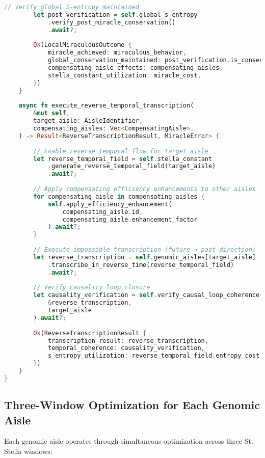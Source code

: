 \documentclass[12pt,a4paper]{article}
\begin{document}
\begin{lstlisting}[language=Rust, caption=St. Stella Constant Genomic Aisle Manager, basicstyle=\footnotesize]
        // Verify global S-entropy maintained
        let post_verification = self.global_s_entropy
            .verify_post_miracle_conservation()
            .await?;
        
        Ok(LocalMiraculousOutcome {
            miracle_achieved: miraculous_behavior,
            global_conservation_maintained: post_verification.is_conserved,
            compensating_aisle_effects: compensating_aisles,
            stella_constant_utilization: miracle_cost,
        })
    }
    
    async fn execute_reverse_temporal_transcription(
        &mut self,
        target_aisle: AisleIdentifier,
        compensating_aisles: Vec<CompensatingAisle>,
    ) -> Result<ReverseTranscriptionResult, MiracleError> {
        
        // Enable reverse temporal flow for target aisle
        let reverse_temporal_field = self.stella_constant
            .generate_reverse_temporal_field(target_aisle)
            .await?;
        
        // Apply compensating efficiency enhancements to other aisles
        for compensating_aisle in compensating_aisles {
            self.apply_efficiency_enhancement(
                compensating_aisle.id,
                compensating_aisle.enhancement_factor
            ).await?;
        }
        
        // Execute impossible transcription (future → past direction)
        let reverse_transcription = self.genomic_aisles[target_aisle]
            .transcribe_in_reverse_time(reverse_temporal_field)
            .await?;
        
        // Verify causality loop closure
        let causality_verification = self.verify_causal_loop_coherence(
            &reverse_transcription,
            target_aisle
        ).await?;
        
        Ok(ReverseTranscriptionResult {
            transcription_result: reverse_transcription,
            temporal_coherence: causality_verification,
            s_entropy_utilization: reverse_temporal_field.entropy_cost,
        })
    }
}
\end{lstlisting}

\subsection{Three-Window Optimization for Each Genomic Aisle}

Each genomic aisle operates through simultaneous optimization across three St. Stella windows:
\end{document}
